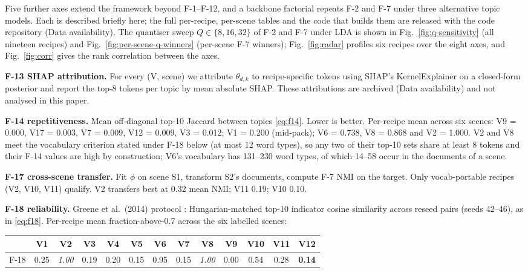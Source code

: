\documentclass[journal,a4paper,10pt]{IEEEtran}
\begin{document}
Five further axes extend the framework beyond F-1--F-12, and a
backbone factorial repeats F-2 and F-7 under three alternative topic
models. Each is described briefly here; the full per-recipe, per-scene tables and the
code that builds them are released with the code repository (Data
availability). The quantiser sweep $Q \in \{8, 16, 32\}$ of F-2 and
F-7 under LDA is shown in Fig.~\ref{fig:q-sensitivity} (all nineteen
recipes) and Fig.~\ref{fig:per-scene-q-winners} (per-scene F-7
winners); Fig.~\ref{fig:radar} profiles six recipes over the eight
axes, and Fig.~\ref{fig:corr} gives the rank correlation between the
axes.

\textbf{F-13 SHAP attribution.} For every (V, scene) we attribute
$\theta_{d,k}$ to recipe-specific tokens using SHAP's KernelExplainer
on a closed-form posterior and report the top-8 tokens per topic by
mean absolute SHAP. These attributions are archived (Data availability)
and not analysed in this paper.

\textbf{F-14 repetitiveness.} Mean off-diagonal top-10 Jaccard between
topics \eqref{eq:f14}. Lower is better. Per-recipe mean across six
scenes:
V9 = 0.000, V17 = 0.003, V7 = 0.009, V12 = 0.009, V3 = 0.012;
V1 = 0.200 (mid-pack); V6 = 0.738, V8 = 0.868 and V2 = 1.000. V2 and
V8 meet the vocabulary criterion stated under F-18 below (at most 12
word types), so any two of their top-10 sets share at least 8 tokens
and their F-14 values are high by construction; V6's vocabulary has
131--230 word types, of which 14--58 occur in the documents of a
scene.

\textbf{F-17 cross-scene transfer.} Fit $\phi$ on scene S1, transform
S2's documents, compute F-7 NMI on the target. Only vocab-portable
recipes (V2, V10, V11) qualify. V2 transfers best at 0.32 mean NMI;
V11 0.19; V10 0.10.

\textbf{F-18 reliability.} Greene et al.\ (2014) protocol \cite{greene2014topics}:
Hungarian-matched \cite{kuhn1955hungarian} top-10 indicator cosine
similarity across reseed pairs (seeds 42--46), as in \eqref{eq:f18}.
Per-recipe mean fraction-above-0.7 across the six labelled scenes:

\begin{center}
\scriptsize
\setlength{\tabcolsep}{2pt}
\begin{tabular}{lcccccccccccc}
\toprule
& V1 & V2 & V3 & V4 & V5 & V6 & V7 & V8 & V9 & V10 & V11 & V12 \\
\midrule
F-18 & 0.25 & \emph{1.00} & 0.19 & 0.20 & 0.15 & 0.95 & 0.15 & \emph{1.00} & 0.00 & 0.54 & 0.28 & \textbf{0.14} \\
\bottomrule
\end{tabular}
\end{center}
\end{document}
